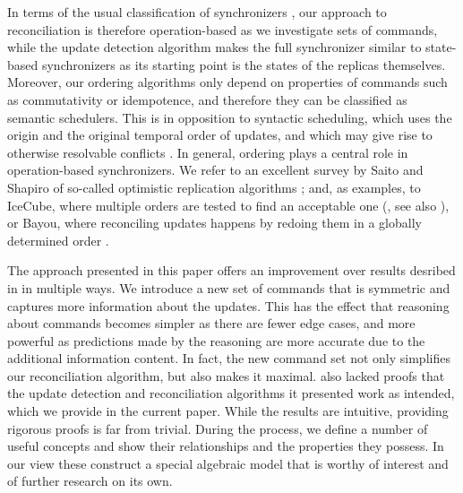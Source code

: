 In terms of the usual classification of synchronizers \cite{TSR, PV, SSH},
our approach to reconciliation is therefore operation-based as we investigate sets of commands,
while the update detection algorithm makes the full synchronizer 
similar to state-based synchronizers 
as its starting point is the states of the replicas themselves.
Moreover, our ordering algorithms only depend on properties of commands 
such as commutativity or idempotence,
and therefore they can be classified as semantic schedulers.
This is in opposition to syntactic scheduling, which uses 
the origin and the original temporal order of updates, 
and which may give rise to otherwise resolvable conflicts \cite{SSH}.
In general, ordering plays a central role in operation-based synchronizers.
We refer to an excellent survey by Saito and Shapiro of so-called optimistic replication algorithms \cite{SSH};
and, as examples,
to IceCube, where multiple orders are tested to find an acceptable one (\cite{KRSD}, see also \cite{MPV}),
or Bayou, where reconciling updates happens by redoing them in a globally determined order \cite{TTPDSH}.

The approach presented in this paper offers an improvement
over results desribed in \cite{NREC} in multiple ways.
We introduce a new set of commands that is symmetric and
captures more information about the updates.
This has the effect that reasoning about commands
becomes simpler as there are fewer edge cases,
and more powerful as 
predictions made by the reasoning are more accurate
due to the additional information content.
In fact, the new command set not only simplifies
our reconciliation algorithm, but also makes it maximal.
\cite{NREC} also lacked proofs that the update detection
and reconciliation algorithms it presented work as intended,
which we provide in the current paper.
While the results are intuitive, providing rigorous proofs
is far from trivial.
During the process, we define a number of useful concepts
and show their relationships and the properties they possess.
In our view these construct a special algebraic model
that is worthy of interest and of further research on its own.

